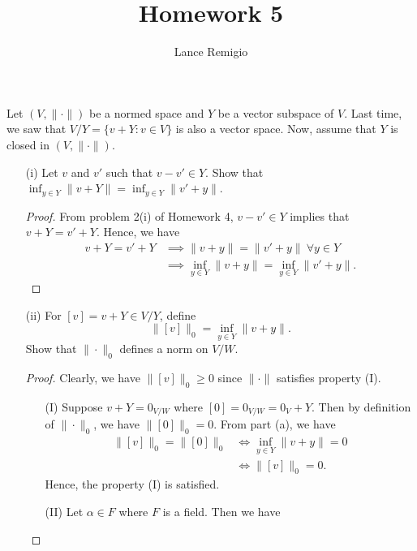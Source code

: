 \documentclass[a4paper]{article}
\title{Homework 5}
\author{Lance Remigio}
\begin{document}
\maketitle

\begin{problem}
    Let \( (V, \|\cdot\|) \) be a normed space and \( Y  \) be a vector subspace of \( V  \). Last time, we saw that \( V / Y  = \{ v + Y  : v \in V  \}  \) is also a vector space. Now, assume that \( Y  \) is closed in \( (V, \|\cdot\| ) \).
\end{problem}

\begin{enumerate}
    \item[(i)] Let \( v  \) and \( v' \) such that \( v - v' \in Y  \). Show that \( \inf_{y \in Y} \|v + Y\| = \inf_{y \in Y} \|v' + y\|  \).
        \begin{proof}
        From problem 2(i) of Homework 4, \( v - v' \in Y \) implies that \( v + Y = v' + Y  \). Hence, we have 
        \begin{align*}
            v + Y = v' + Y  &\implies  \|v + y \| = \|v' + y\| \ \forall y \in Y  \\
                            &\implies \inf_{y \in Y} \|v + y\| = \inf_{y \in Y} \|v' + y\|.
    \end{align*}
        \end{proof}
    \item[(ii)] For \( [v] = v + Y  \in V/ Y \), define 
        \[  \|[v]\|_0 = \inf_{y \in Y } \|v + y\|. \]
        Show that \( \|\cdot\|_{0} \) defines a norm on \( V / W  \).
        \begin{proof}
            Clearly, we have \( \|[v]\|_{0} \geq 0  \) since \( \| \cdot \|  \) satisfies property (I).
        \begin{enumerate}
            \item[(I)] Suppose \( v + Y = {0}_{V/W}  \) where \( [0] =  {0}_{V/W} = {0}_{V} + Y  \). Then by definition of \( \|\cdot\|_{0} \), we have \( \|[0]\|_{0} = 0  \). From part (a), we have
                \begin{align*}
                    \|[v]\|_{0} = \|[0]\|_{0}  &\iff \inf_{y \in Y} \|  v + y \| = 0   \\
                                               &\iff \|[v]\|_{0} = 0. 
                \end{align*}
                Hence, the property (I) is satisfied.
            \item[(II)] Let \( \alpha \in F \) where \( F  \) is a field. Then we have 

\end{enumerate}
\end{proof}
\end{enumerate}
\end{document}
